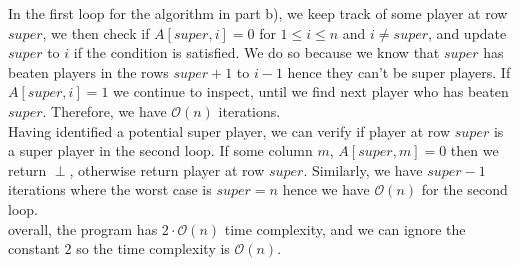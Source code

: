 \begin{parts}
\begin{customsolutionbox}
        In the first loop for the algorithm in part b), we keep track of some 
        player at row $super$, we then check if $A[super, i] = 0$ for $1 \leq i \leq n$ and $i \not= super$, and 
        update $super$ to $i$ if the condition is satisfied.
        We do so because we know that $super$ has beaten players in the rows $super+1$ to $i-1$ hence they
        can't be super players. If $A[super, i] = 1$ we continue to inspect, until we find next player who has beaten 
        $super$. Therefore, we have $\mathcal{O}(n)$ iterations. \\

        Having identified a potential super player, we can verify if player at row $super$ is a super player in the 
        second loop. If some column $m$, $A[super, m]=0$ then we return $\perp$, otherwise return 
        player at row $super$. Similarly, we have $super-1$ iterations where the worst case is $super=n$ hence 
        we have $\mathcal{O}(n)$ for the second loop. \\

        overall, the program has $2\cdot\mathcal{O}(n)$ time complexity, and we can ignore the constant $2$ so the 
        time complexity is $\mathcal{O}(n)$.

    \end{customsolutionbox}
\end{parts}
